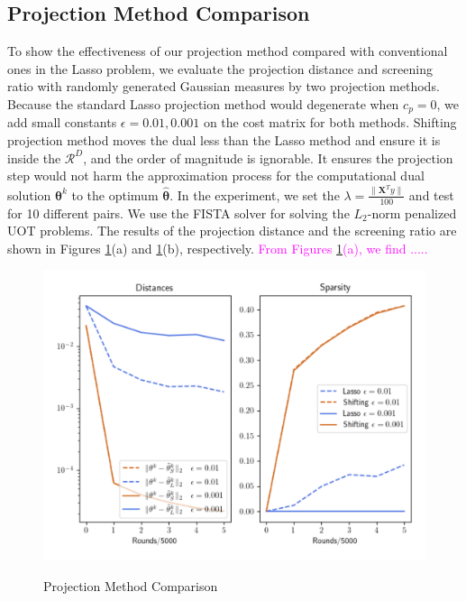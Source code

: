 \documentclass[twoside]{article}
\theoremstyle{plain}
\renewcommand{\vec}[1]{\bm{#1}}
\newcommand{\note}[1]{\textcolor{magenta}{#1}}
\begin{document}
\subsection{Projection Method Comparison}
To show the effectiveness of our projection method compared with conventional ones in the Lasso problem, we evaluate the projection distance and screening ratio with randomly generated Gaussian measures by two projection methods. Because the standard Lasso projection method would degenerate when $c_p=0$, we add small constants $\epsilon=0.01,0.001$ on the cost matrix for both methods. Shifting projection method moves the dual less than the Lasso method and ensure it is inside the $\mathcal{R}^{D}$, and the order of magnitude is ignorable. It ensures the projection step would not harm the approximation process for the computational dual solution $\vec{\theta}^{k}$ to the optimum $\vec{\hat {\theta}}$. In the experiment, we set the $\lambda = \frac{\|\mathbf{X}^Ty\|}{100}$ and test for 10 different pairs. We use the FISTA solver for solving the $L_2$-norm penalized UOT problems. The results of the projection distance and the screening ratio are shown in Figures \ref{Fig:Projection_Method_Comp}(a) and \ref{Fig:Projection_Method_Comp}(b), respectively. \note{From Figures \ref{Fig:Projection_Method_Comp}(a), we find .....}
\begin{figure}[h]
\begin{center}
\label{Fig:ex1}
\includegraphics[width = \linewidth]{pic/ex1}
\caption{Projection Method Comparison}
\label{Fig:Projection_Method_Comp}
\end{center}
\end{figure}
\end{document}
